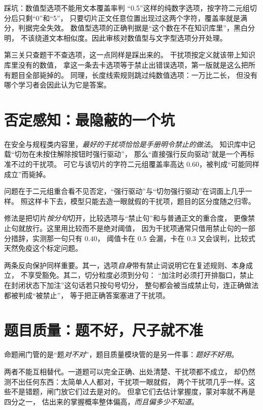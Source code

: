 \begin{keynote}{踩坑：数值型选项不能用文本覆盖率判}
“0.5”这样的纯数字选项，按字符二元组切分后只剩“0”和“5”，
只要切片正文任意位置出现过这两个字符，覆盖率就是满分，判据完全失效。
数值型选项的正确判据是“这个数在不在知识库里”，黑白分明，
不该绕道文本相似度。因此审核对数值型与文字型选项分开处理。
\end{keynote}

第三关只查题干不查选项，这一点同样是踩出来的。
干扰项按定义就该带上知识库里没有的数值，
拿这一条去卡选项等于禁止出错误选项，第一版就是这么把所有题目全部毙掉的。
同理，长度线索规则跳过纯数值选项：一万比二长，
但没有哪个学习者会因此认为它是答案。

\section{否定感知：最隐蔽的一个坑}

在安全与规程类内容里，\emph{最好的干扰项恰恰是手册明令禁止的做法}。
知识库中记载“切勿在未按住解除按钮时强行驱动”，
那么“直接强行反向驱动”就是一个再标准不过的干扰项。
可它与该切片的字符二元组覆盖率高达 $0.60$，被判成“可能同样成立”而毙掉。

问题在于二元组重合看不见否定，“强行驱动”与“切勿强行驱动”在词面上几乎一样。
照这样卡下去，模型只能去造一眼就假的干扰项，题目的区分度随之归零。

修法是把切片\emph{按分句}切开，比较选项与“禁止句”和与普通正文的重合度，
更像禁止句就放行。这里用比较而不是绝对阈值，
因为干扰项通常只借用禁止句的一部分措辞，实测那一句只有 $0.40$，
阈值卡在 $0.5$ 会漏，卡在 $0.3$ 又会误判，比较式天然免疫这个标定问题。

两条反向保护同样重要。其一，选项\emph{自身}带有禁止词说明它在复述规则、本身成立，
不享受豁免。其二，切分粒度必须到分句：
“加注时必须打开排脂口，禁止在封闭状态下加注”这句话若只按句号切分，
整句都会被当成禁止句，连正确做法都被判成“被禁止”，
等于把正确答案塞进了干扰项。

\section{题目质量：题不好，尺子就不准}

命题闸门管的是“题\emph{对不对}”，题目质量模块管的是另一件事：\emph{题好不好用}。

两者不能互相替代。一道题可以完全正确、出处清楚、干扰项都不成立，
却仍然测不出任何东西：太简单人人都对，干扰项一眼就假，
两个干扰项几乎一样。这些不是错题，闸门放它们过去是对的。
但拿它们去估计掌握度，蒙对率就不再是四分之一，
估出来的掌握概率整体偏高，\emph{而且偏多少不知道}。

